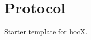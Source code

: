 \documentclass{article}
\begin{document}

\section*{Protocol}
Starter template for hocX.
\end{document}
